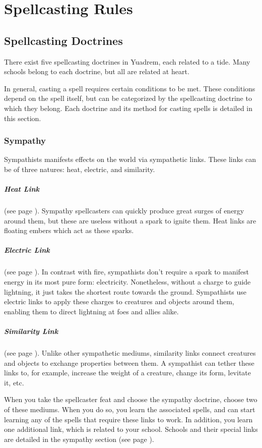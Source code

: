 \section{Spellcasting Rules} \label{sec::spellcastingrules}
\subsection*{Spellcasting Doctrines}
    There exist five spellcasting doctrines in Yuadrem, each related to a tide.
    Many schools belong to each doctrine, but all are related at heart.

    In general, casting a spell requires certain conditions to be met.
    These conditions depend on the spell itself, but can be categorized by the spellcasting doctrine to which they belong.
    Each doctrine and its method for casting spells is detailed in this section.

    \subsubsection{Sympathy}
        Sympathists manifests effects on the world via sympathetic links.
        These links can be of three natures: heat, electric, and similarity.

        \subparagraph{Heat Link}
        (see page \pageref{medium::ember}).
        Sympathy spellcasters can quickly produce great surges of energy around them, but these are useless without a spark to ignite them.
        Heat links are floating embers which act as these sparks.

        \subparagraph{Electric Link}
        (see page \pageref{medium::charge}).
        In contrast with fire, sympathists don't require a spark to manifest energy in its most pure form: electricity.
        Nonetheless, without a charge to guide lightning, it just takes the shortest route towards the ground.
        Sympathists use electric links to apply these charges to creatures and objects around them, enabling them to direct lightning at foes and allies alike.

        \subparagraph{Similarity Link}
        (see page \pageref{medium::tether}).
        Unlike other sympathetic mediums, similarity links connect creatures and objects to exchange properties between them.
        A sympathist can tether these links to, for example, increase the weight of a creature, change its form, levitate it, etc.

        When you take the spellcaster feat and choose the sympathy doctrine, choose two of these mediums.
        When you do so, you learn the associated spells, and can start learning any of the spells that require these links to work.
        In addition, you learn one additional link, which is related to your school.
        Schools and their special links are detailed in the sympathy section (see page \pageref{sec::sympathy}).

